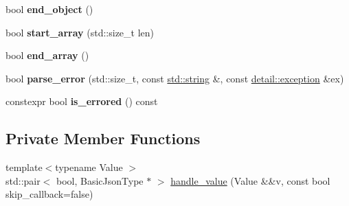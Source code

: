 \begin{DoxyCompactItemize}
\mbox{\label{classnlohmann_1_1detail_1_1json__sax__dom__callback__parser_ae75d313d6d1b9c29508e740a10fefa18}} 
bool {\bfseries end\+\_\+object} ()
\item 
\mbox{\label{classnlohmann_1_1detail_1_1json__sax__dom__callback__parser_a5255b98ba8282e3625968f91cff9d3d0}} 
bool {\bfseries start\+\_\+array} (std\+::size\+\_\+t len)
\item 
\mbox{\label{classnlohmann_1_1detail_1_1json__sax__dom__callback__parser_aa64e7a650952174037d32028de582c12}} 
bool {\bfseries end\+\_\+array} ()
\item 
\mbox{\label{classnlohmann_1_1detail_1_1json__sax__dom__callback__parser_aac6e64f0b59c9150cde974e182d5ecab}} 
bool {\bfseries parse\+\_\+error} (std\+::size\+\_\+t, const \mbox{\hyperlink{namespacenlohmann_1_1detail_a1ed8fc6239da25abcaf681d30ace4985ab45cffe084dd3d20d928bee85e7b0f21}{std\+::string}} \&, const \mbox{\hyperlink{classnlohmann_1_1detail_1_1exception}{detail\+::exception}} \&ex)
\item 
\mbox{\label{classnlohmann_1_1detail_1_1json__sax__dom__callback__parser_a167fd9bf385d3d08bcbbba8a927c0eff}} 
constexpr bool {\bfseries is\+\_\+errored} () const
\end{DoxyCompactItemize}
\subsection*{Private Member Functions}
\begin{DoxyCompactItemize}
\item 
{\footnotesize template$<$typename Value $>$ }\\std\+::pair$<$ bool, Basic\+Json\+Type $\ast$ $>$ \mbox{\hyperlink{classnlohmann_1_1detail_1_1json__sax__dom__callback__parser_a875e678e20e75b37b93b80be78fe60e6}{handle\+\_\+value}} (Value \&\&v, const bool skip\+\_\+callback=false)
\end{DoxyCompactItemize}
